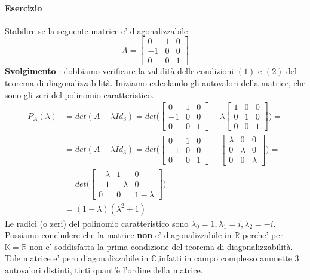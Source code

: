 \documentclass[a4paper, 10pt]{article}
\begin{document}
	\paragraph*{Esercizio}
	Stabilire se la seguente matrice e' diagonalizzabile 
	\[ A = \begin{bmatrix} 0 & 1 & 0 \\ -1 & 0 & 0 \\ 0 & 0 & 1 \end{bmatrix}\]
	\textbf{Svolgimento} : dobbiamo verificare la validità delle condizioni $(1)$ e $(2)$ del teorema di diagonalizzabilità.
	Iniziamo calcolando gli autovalori della matrice, che sono gli zeri del polinomio caratteristico.
	\begin{equation*}
		\begin{split}
			P_A(\lambda) &= det(A - \lambda Id_3) = det \biggl( \begin{bmatrix} 0 & 1 & 0 \\ -1 & 0 & 0 \\ 0 & 0 & 1
			 \end{bmatrix} - \lambda \begin{bmatrix} 1 & 0 & 0 \\ 0 & 1 & 0 \\ 0 & 0 & 1 \end{bmatrix} \biggr) = \\
			 &= det(A - \lambda Id_3) = det \biggl( \begin{bmatrix} 0 & 1 & 0 \\ -1 & 0 & 0 \\ 0 & 0 & 1
			 \end{bmatrix} - \begin{bmatrix} \lambda & 0 & 0 \\ 0 & \lambda & 0 \\ 0 & 0 & \lambda \end{bmatrix}
			 \biggr) = \\
			 &= det \biggl( \begin{bmatrix} -\lambda & 1 & 0 \\ -1 & -\lambda & 0 \\ 0 & 0 & 1 - \lambda 
			 \end{bmatrix}\biggr) =\\ 
			 &= (1-\lambda)(\lambda^2 + 1)
		\end{split}
	\end{equation*}
	Le radici (o zeri) del polinomio caratteristico sono $\lambda_0 =1, \lambda_1 = i, \lambda_2 = -i$. \\
	Possiamo concludere che la matrice \textbf{non} e' diagonalizzabile in $\mathbb{R}$ perche' per $\mathbb{K} = \mathbb{R}$
	non e' soddisfatta la prima condizione del teorema di diagonalizzabilità. Tale matrice e' pero diagonalizzabile in 
	$\mathbb{C}$,infatti in campo complesso ammette 3 autovalori distinti, tinti quant'è l'ordine della matrice.
	
\end{document}
